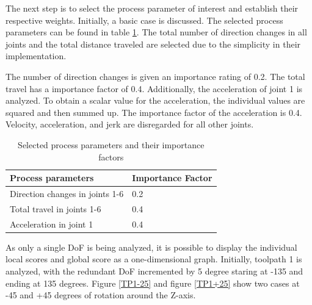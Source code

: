 
The next step is to select the process parameter of interest and establish their respective weights. Initially, a basic case is discussed. The selected process parameters can be found in table \ref{PPbasic}. The total number of direction changes in all joints and the total distance traveled are selected due to the simplicity in their implementation.

The number of direction changes is given an importance rating of 0.2.
The total travel has a importance factor of 0.4. Additionally, the acceleration of joint 1 is analyzed. To obtain a scalar value for the acceleration, the individual values are squared and then summed up. The importance factor of the acceleration is 0.4.
Velocity, acceleration, and jerk are disregarded for all other joints.

\begin{table}[H]
	\centering
	\begin{tabular}{||l|l||}
		Process parameters& Importance Factor \\
		\hline
		\hline
		\hline
		Direction changes in joints 1-6	&		0.2 \\
		Total travel in joints 1-6	&  	0.4 \\
		Acceleration in joint 1	& 		0.4\\
		
		\hline
		\hline
	\end{tabular}
	
	\caption{Selected process parameters and their importance factors}
	\label{PPbasic}
\end{table}


As only a single DoF is being analyzed, it is possible to display the individual local scores and global score as a one-dimensional graph. Initially, toolpath 1 is analyzed, with the redundant DoF incremented by 5 degree staring at -135 and ending at 135 degrees. 
Figure \ref{TP1-25} and figure \ref{TP1+25} show two cases at -45 and +45 degrees of rotation around the Z-axis.

